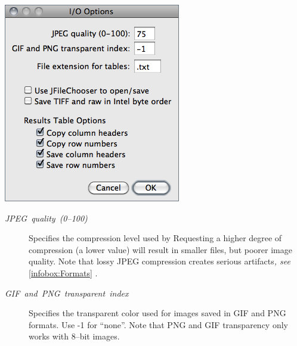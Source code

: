 \begin{minipage}[c][1\totalheight][t]{0.412\columnwidth}%
\includegraphics[scale=0.55]{images/InputOutput}%
\end{minipage}%
\begin{minipage}[c][1\totalheight][t]{0.588\columnwidth}%
\begin{description}
\item [{\emph{JPEG}\ \emph{quality}\ \emph{(0--100)}}] Specifies
the compression level used by 
Requesting a higher degree of compression (a lower value) will result
in smaller files, but poorer image quality. Note that lossy JPEG compression
creates serious artifacts\emph{, see} \ref{infobox:Formats} .
\item [{\emph{GIF\ and\ PNG\ transparent\ index}}] Specifies
the transparent color used for images saved in GIF and PNG formats.
Use -1 for ``none''. Note that PNG and GIF transparency only works
with 8--bit images.\end{description}
%
\end{minipage}
